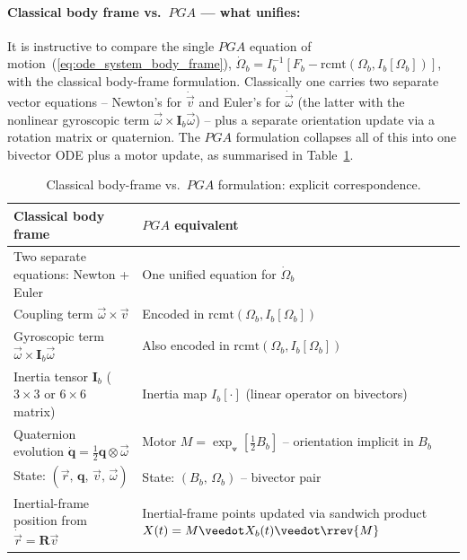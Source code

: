 \paragraph{Classical body frame vs.\ $PGA$ --- what unifies:} It is instructive to compare
the
single $PGA$ equation of motion~(\ref{eq:ode_system_body_frame}), $\dot{\Omega}_b =
I_b^{-1}\!\left[F_b - \mathrm{rcmt}(\Omega_b, I_b[\Omega_b])\right]$, with the classical
body-frame formulation. Classically one carries two separate vector equations -- Newton's
for $\dot{\vec{v}}$ and Euler's for $\dot{\vec{\omega}}$ (the latter with the nonlinear
gyroscopic term $\vec{\omega}\times\mathbf{I}_b\vec{\omega}$) -- plus a separate
orientation update via a rotation matrix or quaternion. The $PGA$ formulation collapses
all of this into one bivector ODE plus a motor update, as summarised in
Table~\ref{tab:classical_vs_pga}. \\

\begin{table}[!ht]
\centering\small
\begin{tabular}{p{6.0cm}|p{6.5cm}}
\hline
Classical body frame &
$PGA$ equivalent \\
\hline
Two separate equations: Newton + Euler &
One unified equation for $\dot{\Omega}_b$ \\
Coupling term $\vec{\omega}\times\vec{v}$ &
Encoded in $\mathrm{rcmt}(\Omega_b, I_b[\Omega_b])$ \\
Gyroscopic term $\vec{\omega}\times\mathbf{I}_b\vec{\omega}$ &
Also encoded in $\mathrm{rcmt}(\Omega_b, I_b[\Omega_b])$ \\
Inertia tensor $\mathbf{I}_b$ ($3\times3$ or $6\times6$ matrix) &
Inertia map $I_b[\cdot]$ (linear operator on bivectors) \\
Quaternion evolution $\dot{\mathbf{q}} = \frac{1}{2}\mathbf{q}\otimes\vec{\omega}$ &
Motor $M = \exp_\veedot[\frac{1}{2} B_b]$ -- orientation implicit in $B_b$ \\
State: $(\vec{r},\, \mathbf{q},\, \vec{v},\, \vec{\omega})$ &
State: $(B_b,\, \Omega_b)$ -- bivector pair \\
Inertial-frame position from $\dot{\vec{r}} = \mathbf{R}\vec{v}$ &
Inertial-frame points updated via sandwich product
$X(t) = M \veedot X_b(t) \veedot \rrev{M}$ \\
\hline
\end{tabular}
\caption{Classical body-frame vs.\ $PGA$ formulation: explicit correspondence.}
\label{tab:classical_vs_pga}
\end{table}

